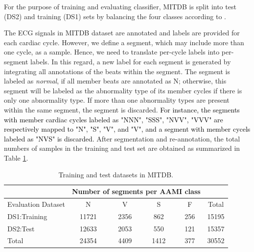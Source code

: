 For the purpose of training and evaluating classifier, MITDB is split into test (DS2) and training (DS1) sets by balancing the four classes according to \cite{autofs}.


The ECG signals in MITDB dataset are annotated and labels are provided for each cardiac cycle. However, we define a segment, which may include more than one cycle, as a sample. Hence, we need to translate per-cycle labels into per-segment labels. In this regard, a new label for each segment is generated by integrating all annotations of the beats within the segment. The segment is labeled as \textit{normal}, if all member beats are annotated as N; otherwise, this segment will be labeled as the abnormality type of its member cycles if there is only one abnormality type. If more than one abnormality types are present within the same segment, the segment is discarded. \textcolor{black}{For instance, the segments with member cardiac cycles labeled as "NNN", "SSS", "NVV", "VVV" are respectively mapped to "N", "S", "V", and "V", and a segment with member cycels labeled as "NVS" is discarded.} 
After segmentation and re-annotation, the total numbers of samples in the training and test set are obtained as summarized in Table \ref{table:ds}.
\begin{table}[t]
	\centering
	\caption{Training and test datasets in MITDB.}
	\vspace{-0.05in}
	\begin{tabular}{|l||c|c|c|c|c|}
		\hline 
		& \multicolumn{4}{c}{Number of segments per AAMI class} &\\ 
		\hline 
		Evaluation Dataset& N & V & S & F &Total \\ 
		\hline 
		DS1:Training & 11721& 2356 & 862 & 256 & 15195\\ 
		\hline 
		DS2:Test & 12633 & 2053 & 550 & 121 & 15357 \\ 
		\hline 
		Total & 24354 & 4409 & 1412 & 377 & 30552 \\ 
		\hline 
	\end{tabular}
	\label{table:ds} 
	\vspace{-0.15in}
\end{table}

